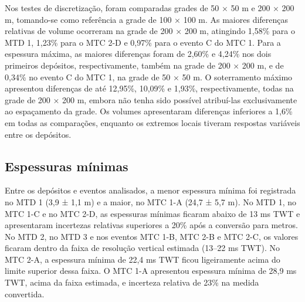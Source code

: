Nos testes de discretização, foram comparadas grades de 50 × 50 m e 200 × 200 m, tomando-se como referência a grade de 100 × 100 m. As maiores diferenças relativas de volume ocorreram na grade de 200 × 200 m, atingindo 1,58\% para o MTD 1, 1,23\% para o MTC 2-D e 0,97\% para o evento C do MTC 1. Para a espessura máxima, as maiores diferenças foram de 2,60\% e 4,24\% nos dois primeiros depósitos, respectivamente, também na grade de 200 × 200 m, e de 0,34\% no evento C do MTC 1, na grade de 50 × 50 m. O soterramento máximo apresentou diferenças de até 12,95\%, 10,09\% e 1,93\%, respectivamente, todas na grade de 200 × 200 m, embora não tenha sido possível atribuí-las exclusivamente ao espaçamento da grade. Os volumes apresentaram diferenças inferiores a 1,6\% em todas as comparações, enquanto os extremos locais tiveram respostas variáveis entre os depósitos.

\subsection{Espessuras mínimas}\label{sec:5-7-1}

Entre os depósitos e eventos analisados, a menor espessura mínima foi registrada no MTD 1 (3,9 ± 1,1 m) e a maior, no MTC 1-A (24,7 ± 5,7 m). No MTD 1, no MTC 1-C e no MTC 2-D, as espessuras mínimas ficaram abaixo de 13 ms TWT e apresentaram incertezas relativas superiores a 20\% após a conversão para metros. No MTD 2, no MTD 3 e nos eventos MTC 1-B, MTC 2-B e MTC 2-C, os valores ficaram dentro da faixa de resolução vertical estimada (13--22 ms TWT). No MTC 2-A, a espessura mínima de 22,4 ms TWT ficou ligeiramente acima do limite superior dessa faixa. O MTC 1-A apresentou espessura mínima de 28,9 ms TWT, acima da faixa estimada, e incerteza relativa de 23\% na medida convertida.

